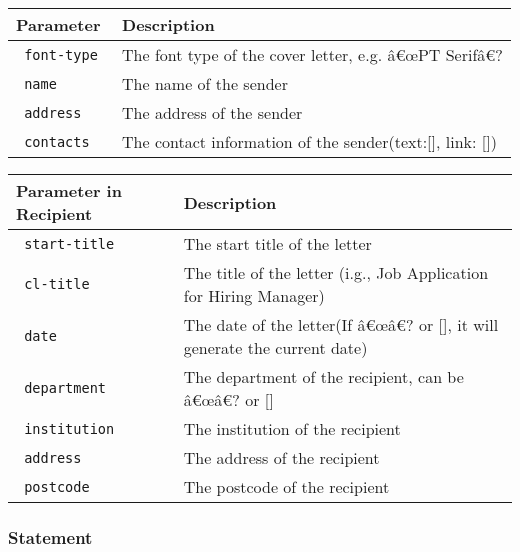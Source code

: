 \begin{longtable}[]{@{}ll@{}}
\toprule\noalign{}
Parameter & Description \\
\midrule\noalign{}
\endhead
\bottomrule\noalign{}
\endlastfoot
\texttt{\ font-type\ } & The font type of the cover letter, e.g. â€œPT
Serifâ€? \\
\texttt{\ name\ } & The name of the sender \\
\texttt{\ address\ } & The address of the sender \\
\texttt{\ contacts\ } & The contact information of the
sender(text:{[}{]}, link: {[}{]}) \\
\end{longtable}

\begin{longtable}[]{@{}ll@{}}
\toprule\noalign{}
Parameter in Recipient & Description \\
\midrule\noalign{}
\endhead
\bottomrule\noalign{}
\endlastfoot
\texttt{\ start-title\ } & The start title of the letter \\
\texttt{\ cl-title\ } & The title of the letter (i.g., Job Application
for Hiring Manager) \\
\texttt{\ date\ } & The date of the letter(If â€œâ€? or {[}{]}, it will
generate the current date) \\
\texttt{\ department\ } & The department of the recipient, can be â€œâ€?
or {[}{]} \\
\texttt{\ institution\ } & The institution of the recipient \\
\texttt{\ address\ } & The address of the recipient \\
\texttt{\ postcode\ } & The postcode of the recipient \\
\end{longtable}

\subsubsection{Statement}\label{statement}

